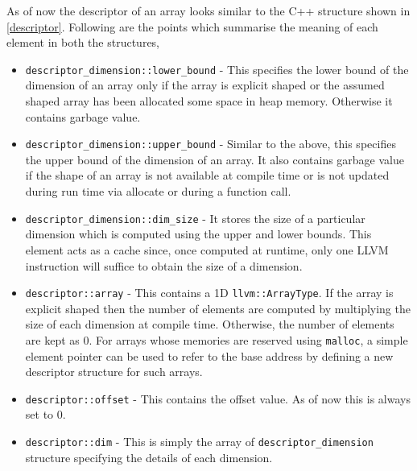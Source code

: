 


As of now the descriptor of an array looks similar to the C++ structure shown in \ref{descriptor}. Following are the points which summarise the meaning of each element in both the structures,

\begin{itemize}

\item \texttt{descriptor\_dimension::lower\_bound} - This specifies the lower bound of the dimension of an array only if the array is explicit shaped or the assumed shaped array has been allocated some space in heap memory. Otherwise it contains garbage value.

\item \texttt{descriptor\_dimension::upper\_bound}  
- Similar to the above, this specifies the upper bound of the dimension of an array. It also contains garbage value if the shape of an array is not available at compile time or is not updated during run time via allocate or during a function call.

\item \texttt{descriptor\_dimension::dim\_size} - It stores the size of a particular dimension which is computed using the upper and lower bounds. This element acts as a cache since, once computed at runtime, only one LLVM instruction will suffice to obtain the size of a dimension.

\item \texttt{descriptor::array} - This contains a 1D \texttt{llvm::ArrayType}. If the array is explicit shaped then the number of elements are computed by multiplying the size of each dimension at compile time. Otherwise, the number of elements are kept as 0. For arrays whose memories are reserved using \texttt{malloc}, a simple element pointer can be used to refer to the base address by defining a new descriptor structure for such arrays.

\item \texttt{descriptor::offset} - This contains the offset value. As of now this is always set to 0.

\item \texttt{descriptor::dim} - This is simply the array of \texttt{descriptor\_dimension} structure specifying the details of each dimension.
 
\end{itemize}

